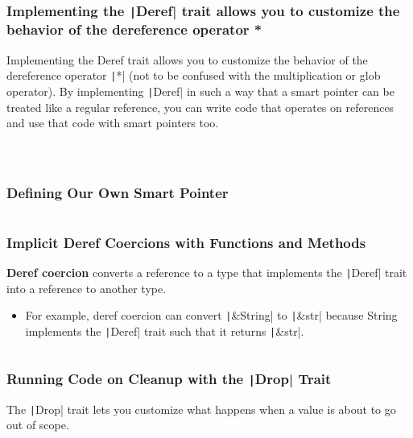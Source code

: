 \documentclass{beamer}
\begin{document}
\begin{frame}[fragile]
	\frametitle{Implementing the \texttt|Deref| trait allows you to customize the behavior of the dereference operator *}
	Implementing the Deref trait allows you to customize the behavior of the dereference operator \texttt|*| (not to be confused with the multiplication or glob operator). By implementing \texttt|Deref| in such a way that a smart pointer can be treated like a regular reference, you can write code that operates on references and use that code with smart pointers too.
	
	\begin{columns}
		\inputminted{rust}{./code/smart3.rs}
		\inputminted{rust}{./code/smart4.rs}
	\end{columns}

\end{frame} 

 \begin{frame}[fragile]
 	\frametitle{Defining Our Own Smart Pointer}
 	\inputminted[fontsize=\scriptsize]{rust}{./code/smart5.rs}
 \end{frame} 

\begin{frame}[fragile]
	\frametitle{Implicit Deref Coercions with Functions and Methods}
	\textbf{Deref coercion} converts a reference to a type that implements the \texttt|Deref| trait into a reference to another type. 
	\begin{itemize}
		\item For example, deref coercion can convert \texttt|&String| to \texttt|&str| because String implements the \texttt|Deref| trait such that it returns \texttt|&str|. 
	\end{itemize}
	\inputminted{rust}{./code/smart6.rs}
\end{frame} 

\begin{frame}[fragile]
	\frametitle{Running Code on Cleanup with the  \texttt|Drop| Trait}
	The \texttt|Drop| trait lets you customize what happens when a value is about to go out of scope.
	
	\inputminted[fontsize=\scriptsize]{rust}{./code/smart7.rs}
\end{frame} 
\end{document}
